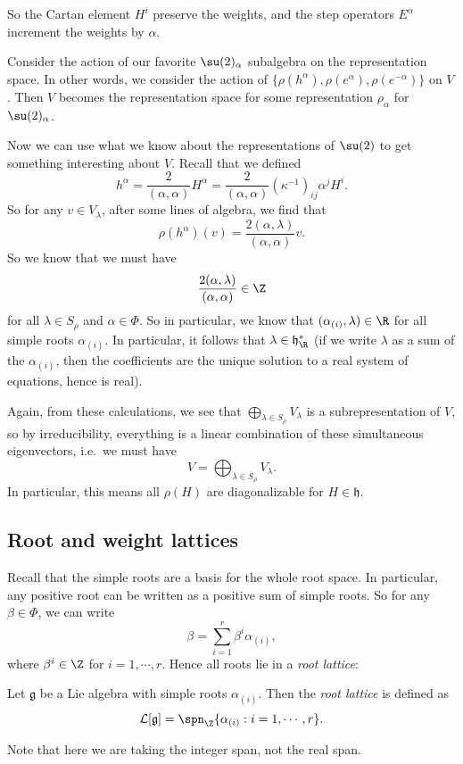 \documentclass[a4paper]{article}
\begin{document}
So the Cartan element $H^i$ preserve the weights, and the step operators $E^\alpha$ increment the weights by $\alpha$.

Consider the action of our favorite $\su(2)_\alpha$ subalgebra on the representation space. In other words, we consider the action of $\{\rho(h^\alpha), \rho(e^\alpha), \rho(e^{-\alpha})\}$ on $V$. Then $V$ becomes the representation space for some representation $\rho_\alpha$ for $\su(2)_\alpha$.

Now we can use what we know about the representations of $\su(2)$ to get something interesting about $V$. Recall that we defined
\[
  h^\alpha = \frac{2}{(\alpha, \alpha)} H^\alpha = \frac{2}{(\alpha, \alpha)} (\kappa^{-1})_{ij} \alpha^j H^i.
\]
So for any $v \in V_\lambda$, after some lines of algebra, we find that
\[
  \rho(h^\alpha)(v) = \frac{2(\alpha, \lambda)}{(\alpha, \alpha)} v.
\]
So we know that we must have
\[
  \frac{2(\alpha, \lambda)}{(\alpha, \alpha)} \in \Z
\]
for all $\lambda \in S_\rho$ and $\alpha \in \Phi$. So in particular, we know that $(\alpha_{(i)}, \lambda) \in \R$ for all simple roots $\alpha_{(i)}$. In particular, it follows that $\lambda \in \mathfrak{h}^*_\R$ (if we write $\lambda$ as a sum of the $\alpha_{(i)}$, then the coefficients are the unique solution to a real system of equations, hence is real).

Again, from these calculations, we see that $\bigoplus_{\lambda \in S_\rho} V_\lambda$ is a subrepresentation of $V$, so by irreducibility, everything is a linear combination of these simultaneous eigenvectors, i.e.\ we must have
\[
  V = \bigoplus_{\lambda \in S_\rho} V_\lambda.
\]
In particular, this means all $\rho(H)$ are diagonalizable for $H \in \mathfrak{h}$.

\subsection{Root and weight lattices}
Recall that the simple roots are a basis for the whole root space. In particular, any positive root can be written as a positive sum of simple roots. So for any $\beta \in \Phi$, we can write
\[
  \beta = \sum_{i = 1}^r \beta^i \alpha_{(i)},
\]
where $\beta^i \in \Z$ for $i = 1, \cdots, r$. Hence all roots lie in a \emph{root lattice}:
\begin{defi}
  Let $\mathfrak{g}$ be a Lie algebra with simple roots $\alpha_{(i)}$. Then the \emph{root lattice} is defined as
  \[
    \mathcal{L}[\mathfrak{g}] = \spn_\Z\{\alpha_{(i)}: i = 1, \cdots, r\}.
  \]
\end{defi}
Note that here we are taking the integer span, not the real span.
\end{document}
